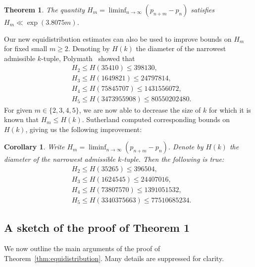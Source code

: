 \documentclass{amsart}
\newtheorem{cor}{Corollary}
\newtheorem{thm}{Theorem}
\numberwithin{equation}{section}
\begin{document}
\begin{thm} \label{thm:infinumboundedgaps}
The quantity $H_m=\liminf_{n \rightarrow \infty} (p_{n+m}-p_n)$ satisfies $ H_m \ll \exp (3.8075 m)$. 
\end{thm}

Our new equidistribution estimates can also be used  to improve bounds on $H_m$ for fixed small $m \geq 2$.  Denoting by $H(k)$ the diameter of the narrowest admissible $k$-tuple,  Polymath~\cite{Polymath:2014:VSS} showed that 
\begin{align*}
&H_2 \leq H(35 410) \leq 398 130,\\
&H_3 \leq H(1649821) \leq  24797814,\\
&H_4 \leq H(75845707) \leq  1431556072,\\
&H_5 \leq H(3473955908) \leq 80550202480.
\end{align*}
For given $m \in \{2,3,4,5\}$, we are now able to decrease the size of $k$ for which it is known that $H_m \leq H(k)$. Sutherland computed corresponding bounds on $H(k)$, giving us the following improvement:

\begin{cor}\label{cor:H2}
Write  $H_m=\liminf_{n \rightarrow \infty} (p_{n+m}-p_n)$. Denote by $H(k)$ the diameter of the narrowest admissible $k$-tuple. Then the following is true:
\begin{align*}
&H_2 \leq H(35265) \leq 396504, \\
&H_3 \leq H(1624545) \leq  24407016,\\
&H_4 \leq H(73807570) \leq  1391051532,\\
&H_5 \leq H(3340375663) \leq 77510685234.
\end{align*} 
\end{cor}

\subsection{A sketch of the proof of Theorem 1} \label{ssec:sketch1} We now outline the main arguments of the proof of Theorem~\ref{thm:equidistribution}.  Many details are suppressed for clarity.
\end{document}
